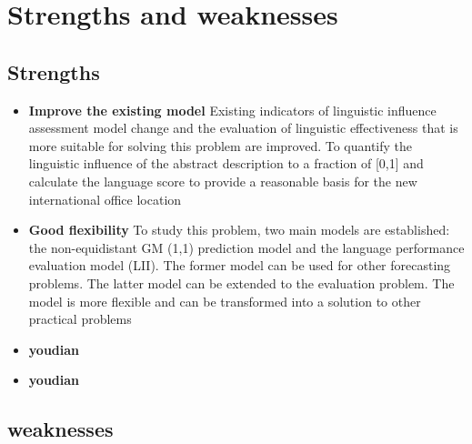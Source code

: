 \section{Strengths and weaknesses}
\subsection{Strengths}
\begin{itemize}
	\item \textbf{Improve the existing model}
\newline Existing indicators of linguistic influence assessment model change and the evaluation of linguistic effectiveness that is more suitable for solving this problem are improved. To quantify the linguistic influence of the abstract description to a fraction of [0,1] and calculate the language score to provide a reasonable basis for the new international office location
	\item \textbf{Good flexibility}
\newline To study this problem, two main models are established: the non-equidistant GM (1,1) prediction model and the language performance evaluation model (LII). The former model can be used for other forecasting problems. The latter model can be extended to the evaluation problem. The model is more flexible and can be transformed into a solution to other practical problems
	\item \textbf{youdian}
	
	\item \textbf{youdian}
	
\end{itemize}

\subsection{weaknesses}

